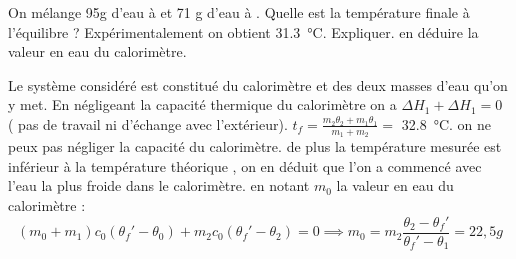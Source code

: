 \begin{Exercise}[title=Valeur en eau]
		On mélange 95g d'eau à  et 71 g d'eau à .
		\Question Quelle est la température finale à l'équilibre ?
		\Question Expérimentalement on obtient \SI{31,3}{\degreeCelsius}. Expliquer.
		\Question en déduire la valeur en eau du calorimètre.
\end{Exercise}
\begin{Answer}
		Le système considéré est constitué du calorimètre et des deux masses d'eau qu'on y met.
		\Question En négligeant la capacité thermique du calorimètre on a $\Delta H_1 +\Delta H_1 = 0 $ ( pas de travail ni d'échange avec l'extérieur). $t_f = \frac{m_2\theta_2+m_1\theta_1}{m_1+m_2} =$ \SI{32,8}{\degreeCelsius}.
		\Question on ne peux pas négliger la capacité du calorimètre. de plus la température mesurée est inférieur à la température théorique , on en déduit que l'on a commencé avec l'eau la plus froide dans le calorimètre.
		\Question en notant $m_0$ la valeur en eau du calorimètre :
		\[ (m_0+m_1)c_0(\theta_f'-\theta_0) +m_2c_0(\theta_f'-\theta_2)=0  \implies m_0 = m_2\frac{\theta_2-\theta_f'}{\theta_f'-\theta_1}= 22,5 g\]
\end{Answer}
